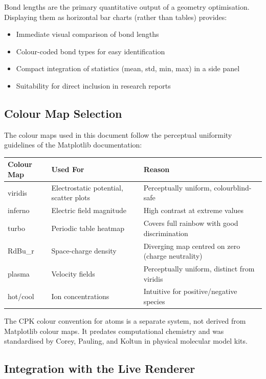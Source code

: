 \documentclass[11pt,a4paper]{article}
\begin{document}
Bond lengths are the primary quantitative output of a geometry
optimisation.  Displaying them as horizontal bar charts (rather than
tables) provides:
\begin{itemize}
  \item Immediate visual comparison of bond lengths
  \item Colour-coded bond types for easy identification
  \item Compact integration of statistics (mean, std, min, max) in a
        side panel
  \item Suitability for direct inclusion in research reports
\end{itemize}

\subsection{Colour Map Selection}

The colour maps used in this document follow the perceptual uniformity
guidelines of the Matplotlib documentation:

\begin{center}
\begin{tabular}{lll}
\toprule
\textbf{Colour Map} & \textbf{Used For} & \textbf{Reason} \\
\midrule
viridis  & Electrostatic potential, scatter plots &
  Perceptually uniform, colourblind-safe \\
inferno  & Electric field magnitude &
  High contrast at extreme values \\
turbo    & Periodic table heatmap &
  Covers full rainbow with good discrimination \\
RdBu\_r  & Space-charge density &
  Diverging map centred on zero (charge neutrality) \\
plasma   & Velocity fields &
  Perceptually uniform, distinct from viridis \\
hot/cool & Ion concentrations &
  Intuitive for positive/negative species \\
\bottomrule
\end{tabular}
\end{center}

\noindent The CPK colour convention for atoms is a separate system,
not derived from Matplotlib colour maps.  It predates computational
chemistry and was standardised by Corey, Pauling, and Koltun in
physical molecular model kits.

\subsection{Integration with the Live Renderer}
\end{document}
